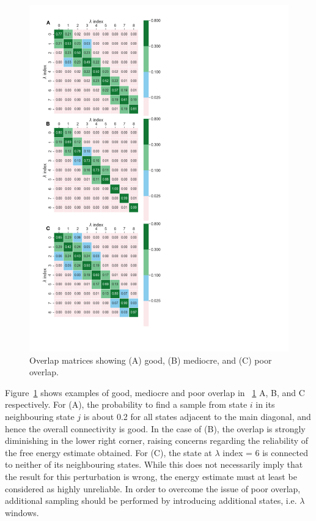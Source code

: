\documentclass[9pt,bestpractices]{livecoms}
\begin{document}
\begin{figure}
\includegraphics[width=0.95\columnwidth]{figures/fig12_overlap/Figure.pdf}
\caption{\label{fig:overlap}Overlap matrices showing (A) good, (B) mediocre, and (C) poor overlap.}
\end{figure}
Figure~\ref{fig:overlap} shows examples of good, mediocre and poor overlap in ~\ref{fig:overlap} A, B, and C respectively. For (A), the probability to find a sample from state $i$ in its neighbouring state $j$ is about 0.2 for all states adjacent to the main diagonal, and hence the overall connectivity is good. In the case of (B), the overlap is strongly diminishing in the lower right corner, raising concerns regarding the reliability of the free energy estimate obtained. For (C), the state at $\lambda$ index = 6 is connected to neither of its neighbouring states. While this does not necessarily imply that the result for this perturbation is wrong, the energy estimate must at least be considered as highly unreliable.
In order to overcome the issue of poor overlap, additional sampling should be performed by introducing additional states, i.e. $\lambda$ windows.
\end{document}
